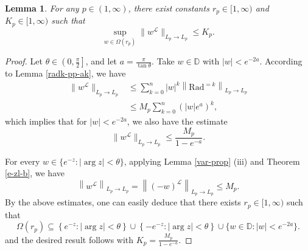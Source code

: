 \documentclass{amsbook}
\newtheorem{lemma}[theorem]{Lemma}
\theoremstyle{definition}
\theoremstyle{remark}
\numberwithin{section}{chapter}
\numberwithin{equation}{chapter}
\newcommand{\1}{\mathbf{1}}
\begin{document}
\begin{lemma}\label{or-k} 
For any $p \in(1, \infty)$, there exist constants $r_p\in[1, \infty)$ and $K_p \in[1, \infty)$ such that
$$\sup _{w \in \Omega(r_p)} \|w^{\mathcal{L}}\|_{L_{p}\rightarrow L_{p}} \leq K_p.$$
\end{lemma}
\begin{proof} 
Let $\theta \in\left(0, \frac{\pi}{2}\right]$, and let  $a=\frac{\pi}{\tan \theta}$. Take $w\in \mathbb{D}$ with $|w|<e^{-2a}$. According to Lemma \ref{radk-pp-ak}, we have
\begin{align*}
 \|w^{\mathcal{L}}\|_{L_{p}\rightarrow L_{p}}
&\leq \sum_{k=0}^{n}|w|^{k}\left\|\mathrm{Rad}^{=k}\right\|_{L_{p}\rightarrow L_{p}}\\
&\leq M_p \sum_{k=0}^{n}(|w| e^{a})^{k},
\end{align*}
which implies that for $|w|<e^{-2a}$, we also have the estimate
$$
\|w^{\mathcal{L}}\|_{L_{p}\rightarrow L_{p}} \leq \frac{M_p}{1-e^{-a}}.
$$

For every $w \in\{e^{-z}:|\arg z|<\theta\}$, applying Lemma  \ref{var-prop} (iii) and  Theorem \ref{e-zl-b},  we have
\[
\left\|w^{\mathcal{L}}\right\|_{L_{p}\rightarrow L_{p}}=\left\|(-w)^{\mathcal{L}}\right\|_{L_{p}\rightarrow L_{p}} \leq M_p.
\]
By the above estimates, one can easily deduce that there exists $r_p \in[1, \infty)$ such that
\begin{equation}\label{or-def}
\Omega(r_p) \subseteq\left\{e^{-z}:|\arg z|<\theta\right\} \cup\left\{-e^{-z}:|\arg z|<\theta\right\} \cup\{w \in \mathbb{D}:|w|<e^{-2 a}\}.
\end{equation}
and the desired result follows with $K_p=\frac{M_p}{1-e^{-a}}$.
\end{proof}
\end{document}

